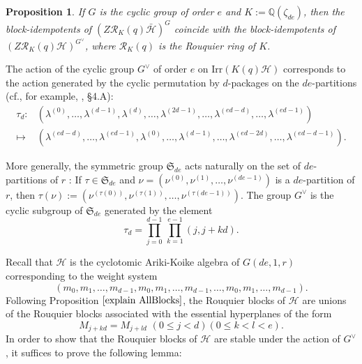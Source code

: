 \documentclass[10pt,a4paper,titlepage]{article}
\newtheorem{proposition}[theorem]{Proposition}
\newcommand{\el}{\lambda}
\begin{document}
\begin{proposition}\label{first step}
If $G$ is the cyclic group of order $e$ and $K:=\mathbb{Q}(\zeta_{de})$, then the block-idempotents of $(Z\mathcal{R}_K(q)\bar{\mathcal{H}})^G$ coincide with the block-idempotents of $(Z\mathcal{R}_K(q)\mathcal{H})^{G^\vee}$, where $\mathcal{R}_K(q)$ is the Rouquier ring of $K$.
\end{proposition}

The action of the cyclic group $G^\vee$ of order $e$ on $\mathrm{Irr}(K(q)\mathcal{H})$ corresponds to the action generated by the cyclic permutation by $d$-packages on the $de$-partitions (cf., for example, \cite{Ma4}, \S4.A):
$$\begin{array}{rl}
\tau_d: &(\el^{(0)},\ldots,\el^{(d-1)},\el^{(d)},\ldots,\el^{(2d-1)},\ldots,\el^{(ed-d)},\ldots,\el^{(ed-1)})\\ \mapsto &(\el^{(ed-d)},\ldots,\el^{(ed-1)},\el^{(0)},\ldots,\el^{(d-1)},\ldots, \el^{(ed-2d)},\ldots,\el^{(ed-d-1)}).
\end{array}$$

More generally, the symmetric group $\mathfrak{S}_{de}$ acts naturally on the set of $de$-partitions of $r$ :  If $\tau \in \mathfrak{S}_{de}$ and
$\nu=(\nu^{(0)},\nu^{(1)},\ldots,\nu^{(de-1)})$ is a  $de$-partition of $r$, then 
$\tau(\nu):=(\nu^{(\tau(0))},\nu^{(\tau(1))},\ldots,\nu^{(\tau(de-1))})$.
The group $G^\vee$ is the cyclic subgroup of $\mathfrak{S}_{de}$ generated by the element
$$\tau_d=\prod_{j=0}^{d-1}\,\prod_{k=1}^{e-1}(j,j+kd).$$

Recall that $\mathcal{H}$ is the cyclotomic Ariki-Koike algebra of $G(de,1,r)$ corresponding to the weight system
 $$(m_0,m_1,\ldots,m_{d-1},m_0,m_1,\ldots,m_{d-1},\ldots,m_0,m_1,\ldots,m_{d-1}).$$
Following Proposition $\ref{explain AllBlocks}$, the Rouquier blocks of $\mathcal{H}$ are unions of the Rouquier blocks associated with the essential hyperplanes of the form
$$M_{j+kd}=M_{j+ld} \,\,(0 \leq j < d) (0 \leq k < l < e).$$
In order to show that the Rouquier blocks of $\mathcal{H}$ are stable under the action of $G^\vee$, it suffices to prove the following lemma: 
\end{document}
